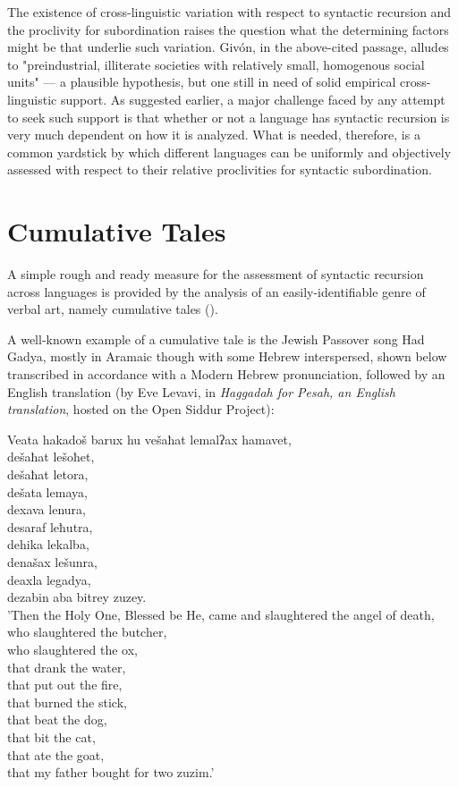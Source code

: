 \documentclass[output=paper,colorlinks,citecolor=brown
]{langscibook}
\begin{document}
The existence of cross-linguistic variation with respect to syntactic recursion and the proclivity for subordination raises the question what the determining factors might be that underlie such variation.  Givón, in the above-cited passage, alludes to "preindustrial, illiterate societies with relatively small, homogenous social units" — a plausible hypothesis, but one still in need of solid empirical cross-linguistic support.  As suggested earlier, a major challenge faced by any attempt to seek such support is that whether or not a language has syntactic recursion is very much dependent on how it is analyzed.  What is needed, therefore, is a common yardstick by which different languages can be uniformly and objectively assessed with respect to their relative proclivities for syntactic subordination.

\section{Cumulative Tales}
A simple rough and ready measure for the assessment of syntactic recursion across languages is provided by the analysis of an easily-identifiable genre of verbal art, namely cumulative tales (\cites[230-234]{thompson1946folktale}[522:536]{aarne1961types}).

A well-known example of a cumulative tale is the Jewish Passover song Had Gadya, mostly in Aramaic though with some Hebrew interspersed, shown below transcribed in accordance with a Modern Hebrew pronunciation, followed by an English translation (by Eve Levavi, in \emph{Haggadah for Pesah, an English translation}, hosted on the Open Siddur Project):

\ea

Veata hakadoš barux hu vešaħat lemalʔax hamavet,\\	
 dešaħat lešoħet,\\
 dešaħat letora,\\
 dešata lemaya,\\
 dexava lenura,\\
 desaraf leħutra,\\
 dehika lekalba,\\
 denašax lešunra,\\
 deaxla legadya,\\
 dezabin aba bitrey zuzey.\\

 'Then the Holy One, Blessed be He, came and slaughtered the angel of death,\\
 who slaughtered the butcher,\\
 who slaughtered the ox, \\
 that drank the water, \\
 that put out the fire, \\
 that burned the stick, \\
 that beat the dog, \\
 that bit the cat, \\
 that ate the goat, \\
 that my father bought for two zuzim.'
\end{document}
